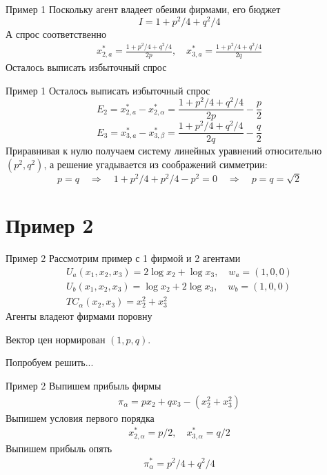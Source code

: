 \documentclass{beamer}
\begin{document}
\begin{frame}{Пример 1}
Поскольку агент владеет обеими фирмами, его бюджет
$$ I = 1 + p^2/4 + q^2/4$$
А спрос соответственно
\begin{gather*}
	x^*_{2,a} = \frac{1 + p^2/4 + q^2/4}{2p}, \quad 
	x^*_{3,a} = \frac{1 + p^2/4 + q^2/4}{2q}
\end{gather*}
Осталось выписать избыточный спрос
\end{frame}

\begin{frame}{Пример 1}
Осталось выписать избыточный спрос
$$E_2 = x^*_{2,a} - x^*_{2,\alpha} = \frac{1 + p^2/4 + q^2/4}{2p} - \frac{p}{2}$$
$$E_3 = x^*_{3,a} - x^*_{3,\beta} = \frac{1 + p^2/4 + q^2/4}{2q} - \frac{q}{2}$$
Приравнивая к нулю получаем систему линейных уравнений относительно $(p^2,q^2)$, а решение угадывается из соображений симметрии:
$$ p = q \quad \Rightarrow \quad 1+ p^2/4 + p^2/4 - p^2 = 0 \quad \Rightarrow \quad p = q = \sqrt{2}$$
\end{frame}

\section{Пример 2}

\begin{frame}{Пример 2}
Рассмотрим пример с 1 фирмой и 2 агентами
\begin{gather*}
	U_a(x_1, x_2, x_3) = 2 \log x_2 + \log x_3, \quad w_a = (1,0,0)\\
	U_b(x_1, x_2, x_3) = \log x_2 + 2 \log x_3, \quad w_b = (1,0,0)\\
	TC_{\alpha}(x_2, x_3) = x_2^2 + x_3^2 
\end{gather*}
Агенты владеют фирмами поровну

Вектор цен нормирован $(1, p, q)$.

Попробуем решить...
\end{frame}

\begin{frame}{Пример 2}
Выпишем прибыль фирмы
\begin{gather*}
	\pi_{\alpha} = p x_2 + q x_3 - (x_2^2 + x_3^2)
\end{gather*}
Выпишем условия первого порядка
\begin{gather*}
	x^*_{2,\alpha} = p/2, \quad 
	x^*_{3,\alpha} = q/2
\end{gather*}
Выпишем прибыль опять
\begin{gather*}
	\pi^*_{\alpha} = p^2/4 + q^2/4
\end{gather*}
\end{frame}
\end{document}
